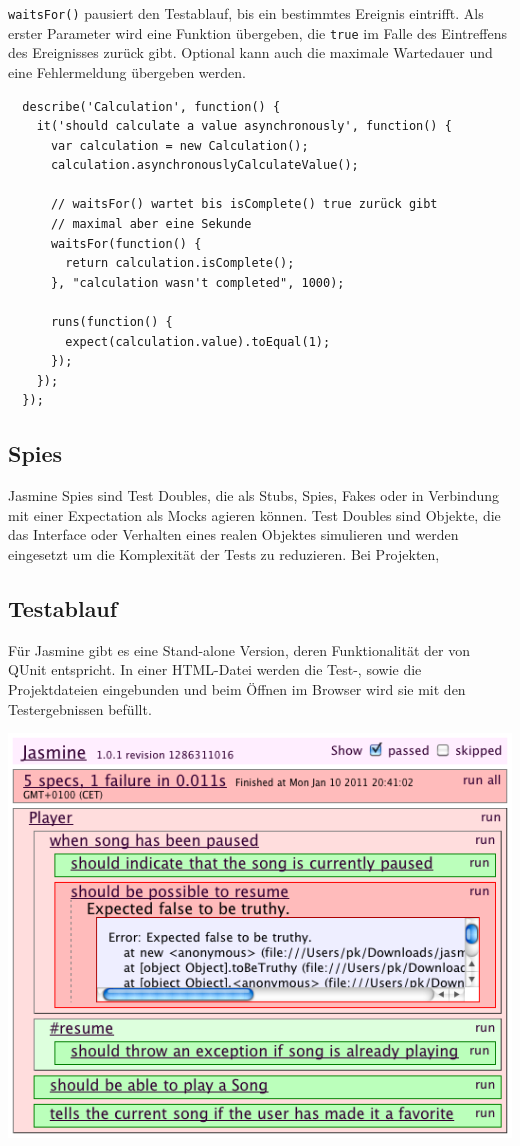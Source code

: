 \documentclass[11pt, a4paper]{article}
\begin{document}
\texttt{waitsFor()} pausiert den Testablauf, bis ein bestimmtes Ereignis
eintrifft. Als erster Parameter wird eine Funktion übergeben, die \texttt{true}
im Falle des Eintreffens des Ereignisses zurück gibt. Optional kann auch die
maximale Wartedauer und eine Fehlermeldung übergeben werden.

\begin{verbatim}
  describe('Calculation', function() {
    it('should calculate a value asynchronously', function() {
      var calculation = new Calculation();
      calculation.asynchronouslyCalculateValue();

      // waitsFor() wartet bis isComplete() true zurück gibt
      // maximal aber eine Sekunde
      waitsFor(function() {
        return calculation.isComplete();
      }, "calculation wasn't completed", 1000);

      runs(function() {
        expect(calculation.value).toEqual(1);
      });
    });
  });
\end{verbatim}

\subsection{Spies}

Jasmine Spies sind Test Doubles\cite{meszaros_test_2011-1}, die als Stubs, Spies, Fakes oder in Verbindung
mit einer Expectation als Mocks agieren können. Test Doubles sind Objekte, die
das Interface oder Verhalten eines realen Objektes simulieren und werden
eingesetzt um die Komplexität der Tests zu reduzieren. Bei Projekten, 

\subsection{Testablauf}

Für Jasmine gibt es eine Stand-alone Version, deren Funktionalität der von QUnit
entspricht. In einer HTML-Datei werden die Test-, sowie die Projektdateien
eingebunden und beim Öffnen im Browser wird sie mit den Testergebnissen befüllt.

\begin{center}
  \includegraphics[width = 1\textwidth]{Jasmine.png}
\end{center}
\end{document}
